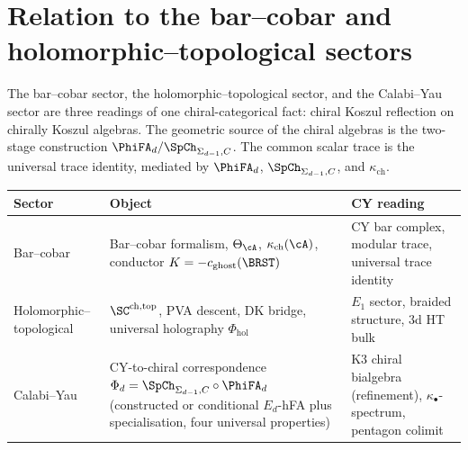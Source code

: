 \section{Relation to the bar--cobar and holomorphic--topological sectors}
\label{sec:relation-vols}

The bar--cobar sector, the holomorphic--topological sector, and the
Calabi--Yau sector are three readings of one chiral-categorical fact:
chiral Koszul reflection on chirally Koszul algebras. The geometric
source of the chiral algebras is the two-stage construction
\(\PhiFA_d/\SpCh_{\Sigma_{d-1},C}\). The common scalar trace is the
universal trace identity, mediated by
$\PhiFA_d$, $\SpCh_{\Sigma_{d-1}, C}$, and
$\kappa_{\mathrm{ch}}$.

\begin{center}
\renewcommand{\arraystretch}{1.4}
\small
\begin{tabular}{p{}p{}p{}}
 \toprule
 \textbf{Sector} & \textbf{Object}
 & \textbf{CY reading} \\
 \midrule
 Bar--cobar
 & Bar--cobar formalism, $\Theta_\cA$,
 $\kappa_{\mathrm{ch}}(\cA)$, conductor
 $K = -c_{\mathrm{ghost}}(\BRST)$
 & CY bar complex, modular trace,
 universal trace identity \\
 Holomorphic--topological
 & $\SC^{\mathrm{ch,top}}$, PVA descent, DK bridge,
 universal holography $\Phi_{\mathrm{hol}}$
 & $E_1$ sector, braided structure,
 3d HT bulk \\
 Calabi--Yau
 & CY-to-chiral correspondence
 $\Phi_d = \SpCh_{\Sigma_{d-1}, C}\circ\PhiFA_d$
 (constructed or conditional $E_d$-hFA plus specialisation,
 four universal properties)
 & K3 chiral bialgebra (refinement),
 $\kappa_\bullet$-spectrum,
 pentagon colimit \\
 \bottomrule
\end{tabular}
\end{center}

